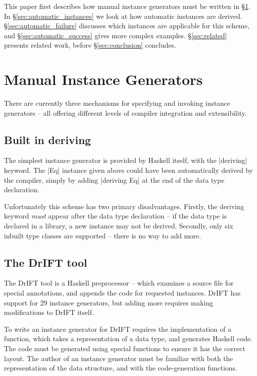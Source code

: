 \documentclass{llncs}
\begin{document}
This paper first describes how manual instance generators must be written in \S\ref{sec:manual_instances}. In \S\ref{sec:automatic_instances} we look at how automatic instances are derived. \S\ref{sec:automatic_failure} discusses which instances are applicable for this scheme, and \S\ref{sec:automatic_success} gives more complex examples. \S\ref{sec:related} presents related work, before \S\ref{sec:conclusion} concludes.


\section{Manual Instance Generators}
\label{sec:manual_instances}

There are currently three mechanisms for specifying and invoking instance generators -- all offering different levels of compiler integration and extensibility.

\subsection{Built in deriving}

The simplest instance generator is provided by Haskell itself, with the |deriving| keyword. The |Eq| instance given above could have been automatically derived by the compiler, simply by adding |deriving Eq| at the end of the data type declaration.

Unfortunately this scheme has two primary disadvantages. Firstly, the deriving keyword \textit{must} appear after the data type declaration -- if the data type is declared in a library, a new instance may not be derived. Secondly, only six inbuilt type classes are supported -- there is no way to add more.

\subsection{The DrIFT tool}

The DrIFT tool \cite{drift} is a Haskell preprocessor -- which examines a source file for special annotations, and appends the code for requested instances. DrIFT has support for 29 instance generators, but adding more requires making modifications to DrIFT itself.

To write an instance generator for DrIFT requires the implementation of a function, which takes a representation of a data type, and generates Haskell code. The code must be generated using special functions to ensure it has the correct layout. The author of an instance generator must be familiar with both the representation of the data structure, and with the code-generation functions.
\end{document}
